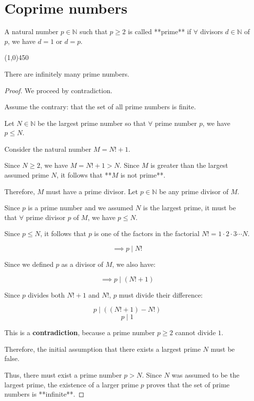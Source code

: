 \section{Coprime numbers}
\begin{definition}
    A natural number $p \in \mathbb{N}$ such that $p \ge 2$ is called **prime** if $\forall$ divisors $d \in \mathbb{N}$ of $p$, we have $d=1$ or $d=p$.
\end{definition}

    \begin{center}
        \vspace{10pt}
        \line(1,0){450}
        \vspace{25pt}
    \end{center}

\begin{theorem}[Euclid]
    There are infinitely many prime numbers.
\end{theorem}

\begin{proof}
    We proceed by contradiction.
    
    Assume the contrary: that the set of all prime numbers is finite.
    
    Let $N \in \mathbb{N}$ be the largest prime number so that $\forall$ prime number $p$, we have $p \le N$.
    
    Consider the natural number $M = N! + 1$.
    
    Since $N \ge 2$, we have $M = N! + 1 > N$. Since $M$ is greater than the largest assumed prime $N$, it follows that **$M$ is not prime**.
    
    Therefore, $M$ must have a prime divisor. Let $p \in \mathbb{N}$ be any prime divisor of $M$.
    
    Since $p$ is a prime number and we assumed $N$ is the largest prime, it must be that $\forall$ prime divisor $p$ of $M$, we have $p \le N$.
    
    Since $p \le N$, it follows that $p$ is one of the factors in the factorial $N! = 1 \cdot 2 \cdot 3 \cdots N$.
    
    $$\implies p \mid N!$$
    
    Since we defined $p$ as a divisor of $M$, we also have:
    
    $$\implies p \mid (N! + 1)$$
    
    Since $p$ divides both $N! + 1$ and $N!$, $p$ must divide their difference:
    
    $$p \mid ((N! + 1) - N!)$$
    $$p \mid 1$$
    
    This is a \textbf{contradiction}, because a prime number $p \ge 2$ cannot divide $1$.
    
    Therefore, the initial assumption that there exists a largest prime $N$ must be false.
    
    Thus, there must exist a prime number $p > N$. Since $N$ was assumed to be the largest prime, the existence of a larger prime $p$ proves that the set of prime numbers is **infinite**.
\end{proof}

